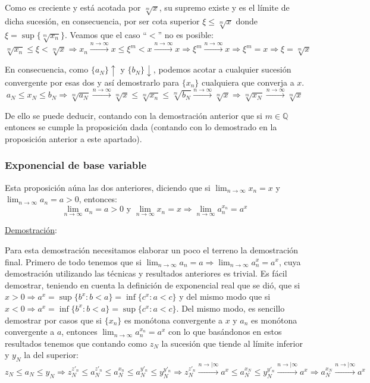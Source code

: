 \documentclass[10pt,a4paper,openright]{book}
\begin{document}
Como es creciente y está acotada por $\sqrt[m]{x}$, su supremo existe y es el límite de dicha sucesión, en consecuencia, por ser cota superior $\xi\leq \sqrt[m]{x}$ donde $\xi=\sup\{\sqrt[m]{x_n}\}$. Veamos que el caso ``$<$'' no es posible:
$$\sqrt[m]{x_n}\leq \xi< \sqrt[m]{x}\Rightarrow x_n\xrightarrow{n\rightarrow\infty}x\leq \xi^m<x\xrightarrow{n\rightarrow\infty}x\Rightarrow \xi^m\xrightarrow{n\rightarrow\infty}x\Rightarrow \xi^m=x\Rightarrow \xi=\sqrt[m]{x}$$

En consecuencia, como $\{a_N\}\uparrow$ y $\{b_N\}\downarrow$, podemos acotar a cualquier sucesión convergente por esas dos y así demostrarlo para $\{x_n\}$ cualquiera que converja a $x$.
$$a_N\leq x_N\leq b_N\Rightarrow \sqrt[m]{a_N}\xrightarrow{n\rightarrow\infty}\sqrt[m]{x}\leq \sqrt[m]{x_n}\leq \sqrt[m]{b_N}\xrightarrow{n\rightarrow\infty}\sqrt[m]{x}\Rightarrow \sqrt[m]{x_N}\xrightarrow{n\rightarrow\infty}\sqrt[m]{x}$$

De ello se puede deducir, contando con la demostración anterior que si $m\in \mathbb Q$ entonces se cumple la proposición dada (contando con lo demostrado en la proposición anterior a este apartado).

\subsubsection*{Exponencial de base variable}
Esta proposición aúna las dos anteriores, diciendo que si $\lim_{n\rightarrow \infty}x_n = x$ y $\lim_{n\rightarrow\infty}a_n=a>0$, entonces:
$$\lim_{n\rightarrow\infty}a_n=a>0 \mbox{ y } \lim_{n\rightarrow\infty}x_n=x\Rightarrow \lim_{n\rightarrow\infty}a_n^{x_n}=a^x$$

\underline{Demostración}:\par
Para esta demostración necesitamos elaborar un poco el terreno la demostración final. Primero de todo tenemos que si $\lim_{n\rightarrow \infty} a_n=a\Rightarrow \lim_{n\rightarrow \infty}a_n^x=a^x$, cuya demostración utilizando las técnicas y resultados anteriores es trivial. Es fácil demostrar, teniendo en cuenta la definición de exponencial real que se dió, que si $x>0\Rightarrow a^x=\sup\{b^x: b<a\}=\inf\{c^x: a<c\}$ y del mismo modo que si $x<0\Rightarrow a^x=\inf\{b^x: b<a\}=\sup\{c^x: a<c\}$. Del mismo modo, es sencillo demostrar por casos que si $\{x_n\}$ es monótona convergente a $x$ y $a_n$ es monótona convergente a $a$, entonces $\lim_{n\rightarrow\infty} a_n^{x_n}=a^x$ con lo que basándonos en estos resultados tenemos que contando como $z_N$ la sucesión que tiende al límite inferior y $y_N$ la del superior:
$$z_N\leq a_N\leq y_N\Rightarrow z_N^{z'_n}\leq a_N^{z'_n}\leq a_N^{x_n}\leq a_N^{y'_n}\leq y_N^{y'_n}\Rightarrow z_N^{z'_n}\xrightarrow{n\rightarrow|\infty}a^x\leq a_N^{x_N}\leq y_N^{y'_n}\xrightarrow{n\rightarrow|\infty}a^x\Rightarrow a_N^{x_N}\xrightarrow{n\rightarrow|\infty}a^x$$
\end{document}
